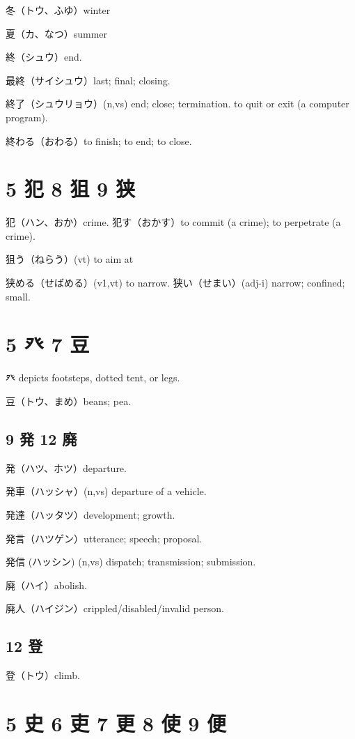 冬（トウ、ふゆ）winter

夏（カ、なつ）summer

終（シュウ）end.

最終（サイシュウ）last; final; closing.

終了（シュウリョウ）(n,vs)
end; close; termination.
to quit or exit (a computer program).

終わる（おわる）to finish; to end; to close.

\section{5 犯 8 狙 9 狭}

犯（ハン、おか）crime.
犯す（おかす）to commit (a crime); to perpetrate (a crime).

狙う（ねらう）(vt) to aim at

狭める（せばめる）(v1,vt) to narrow.
狭い（せまい）(adj-i) narrow; confined; small.

\section{5 癶 7 豆}

癶 depicts footsteps, dotted tent, or legs.

豆（トウ、まめ）beans; pea.

\subsection{9 発 12 廃}

発（ハツ、ホツ）departure.

発車（ハッシャ）(n,vs) departure of a vehicle.

発達（ハッタツ）development; growth.

発言（ハツゲン）utterance; speech; proposal.

発信 (ハッシン) (n,vs) dispatch; transmission; submission.

廃（ハイ）abolish.

廃人（ハイジン）crippled/disabled/invalid person.

\subsection{12 登}

登（トウ）climb.

\section{5 史 6 吏 7 更 8 使 9 便}

